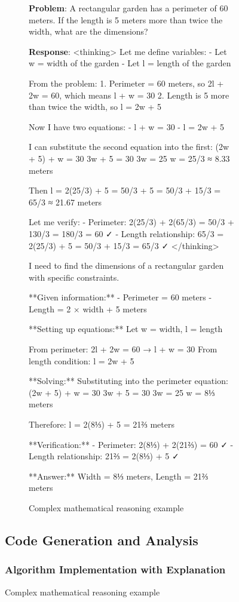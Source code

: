 \begin{table}[H]
\begin{figure}[H]
\begin{figure}[H]
\begin{minipage}{\textwidth}
\textbf{Problem}: A rectangular garden has a perimeter of 60 meters. If the length is 5 meters more than twice the width, what are the dimensions?

\textbf{\supra{} Response}:
<thinking>
Let me define variables:
- Let w = width of the garden
- Let l = length of the garden

From the problem:
1. Perimeter = 60 meters, so 2l + 2w = 60, which means l + w = 30
2. Length is 5 more than twice the width, so l = 2w + 5

Now I have two equations:
- l + w = 30
- l = 2w + 5

I can substitute the second equation into the first:
(2w + 5) + w = 30
3w + 5 = 30
3w = 25
w = 25/3 ≈ 8.33 meters

Then l = 2(25/3) + 5 = 50/3 + 5 = 50/3 + 15/3 = 65/3 ≈ 21.67 meters

Let me verify:
- Perimeter: 2(25/3) + 2(65/3) = 50/3 + 130/3 = 180/3 = 60 ✓
- Length relationship: 65/3 = 2(25/3) + 5 = 50/3 + 15/3 = 65/3 ✓
</thinking>

I need to find the dimensions of a rectangular garden with specific constraints.

**Given information:**
- Perimeter = 60 meters  
- Length = 2 × width + 5 meters

**Setting up equations:**
Let w = width, l = length

From perimeter: 2l + 2w = 60 → l + w = 30
From length condition: l = 2w + 5

**Solving:**
Substituting into the perimeter equation:
(2w + 5) + w = 30
3w + 5 = 30
3w = 25
w = 8⅓ meters

Therefore: l = 2(8⅓) + 5 = 21⅔ meters

**Verification:**
- Perimeter: 2(8⅓) + 2(21⅔) = 60 ✓
- Length relationship: 21⅔ = 2(8⅓) + 5 ✓

**Answer:** Width = 8⅓ meters, Length = 21⅔ meters
\end{minipage}
\caption{Complex mathematical reasoning example}
\label{fig:math-example}
\end{figure}

\subsection{Code Generation and Analysis}

\subsubsection{Algorithm Implementation with Explanation}


\end{figure}
\end{table}
